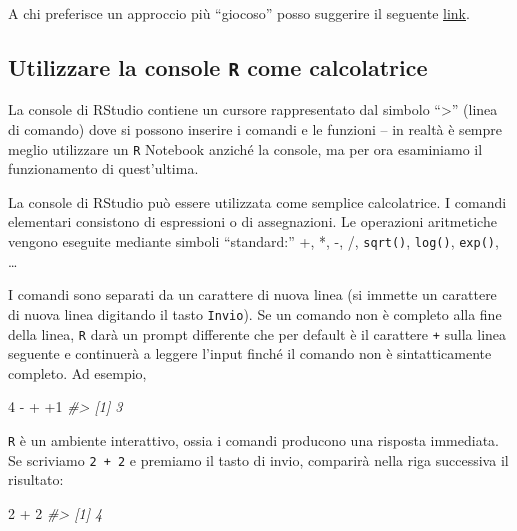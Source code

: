 \documentclass[
]{memoir}
\newenvironment{Shaded}{\begin{snugshade}}{\end{snugshade}}
\newcommand{\CommentTok}[1]{\textcolor[rgb]{0.56,0.35,0.01}{\textit{#1}}}
\newcommand{\DecValTok}[1]{\textcolor[rgb]{0.00,0.00,0.81}{#1}}
\newcommand{\SpecialCharTok}[1]{\textcolor[rgb]{0.00,0.00,0.00}{#1}}
\theoremstyle{definition}
\theoremstyle{definition}
\theoremstyle{definition}
\theoremstyle{definition}
\theoremstyle{remark}
\begin{document}
A chi preferisce un approccio più ``giocoso'' posso suggerire il seguente \href{https://tinystats.github.io/teacups-giraffes-and-statistics/01_introToR.html}{link}.

\hypertarget{utilizzare-la-console-r-come-calcolatrice}{%
\subsection{\texorpdfstring{Utilizzare la console \texttt{R} come calcolatrice}{Utilizzare la console R come calcolatrice}}\label{utilizzare-la-console-r-come-calcolatrice}}

La console di RStudio contiene un cursore rappresentato dal simbolo ``\textgreater{}''
(linea di comando) dove si possono inserire i comandi e le funzioni --
in realtà è sempre meglio utilizzare un \texttt{R} Notebook anziché la console,
ma per ora esaminiamo il funzionamento di quest'ultima.

La console di RStudio può essere utilizzata come semplice calcolatrice.
I comandi elementari consistono di espressioni o di assegnazioni. Le
operazioni aritmetiche vengono eseguite mediante simboli ``standard:'' +,
*, -, /, \texttt{sqrt()}, \texttt{log()}, \texttt{exp()}, \ldots{}

I comandi sono separati da un carattere di nuova linea (si immette un
carattere di nuova linea digitando il tasto \texttt{Invio}). Se un comando non
è completo alla fine della linea, \texttt{R} darà un prompt differente che per
default è il carattere \texttt{+} sulla linea seguente e continuerà a leggere
l'input finché il comando non è sintatticamente completo. Ad esempio,

\begin{Shaded}
\begin{Highlighting}[]
\DecValTok{4} \SpecialCharTok{{-}}
  \SpecialCharTok{+}
    \SpecialCharTok{+}\DecValTok{1}
\CommentTok{\#\textgreater{} [1] 3}
\end{Highlighting}
\end{Shaded}

\texttt{R} è un ambiente interattivo, ossia i comandi producono una risposta immediata. Se scriviamo \texttt{2\ +\ 2} e premiamo il tasto di invio, comparirà nella riga successiva il risultato:

\begin{Shaded}
\begin{Highlighting}[]
\DecValTok{2} \SpecialCharTok{+} \DecValTok{2}
\CommentTok{\#\textgreater{} [1] 4}
\end{Highlighting}
\end{Shaded}
\end{document}
